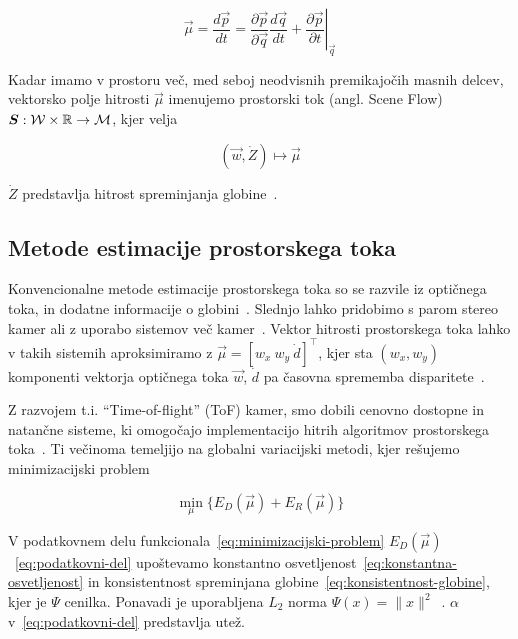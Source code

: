 \begin{equation}\label{eq:scene-flow}
	\vec{\mu} = \frac{d\vec{p}}{dt} = \frac{\partial \vec{p}}{\partial \vec{q}} \frac{d\vec{q}}{dt} + \left.\frac{\partial \vec{p}}{\partial t}\right|_{\vec{q}}
\end{equation}

Kadar imamo v prostoru več, med seboj neodvisnih premikajočih masnih delcev, vektorsko polje hitrosti $\vec{\mu}$ imenujemo prostorski tok (angl. Scene Flow) ${\boldsymbol{S}}: \mathcal{W} \times \mathbb{R} \to \mathcal{M}$, kjer velja

\begin{equation}
(\vec{w}, \dot{Z}) \mapsto \vec{\mu}
\label{eq:of-sf}
\end{equation}



$\dot{Z}$ predstavlja hitrost spreminjanja globine~\cite{yan2016scene}.

\subsection{Metode estimacije prostorskega toka}
Konvencionalne metode estimacije prostorskega toka so se razvile iz optičnega toka, in dodatne informacije o globini~\cite{yan2016scene}. Slednjo lahko pridobimo s parom stereo kamer ali z uporabo sistemov več kamer~\cite{jaimez2015primal}. Vektor hitrosti prostorskega toka lahko v takih sistemih aproksimiramo z $\vec{\mu} = \left[w_x~w_y~\dot{d}\right]^\top$, kjer sta $(w_x, w_y)$ komponenti vektorja optičnega toka $\vec{w}$, $\dot{d}$ pa časovna sprememba disparitete~\cite{yan2016scene}.

Z razvojem t.i. ``Time-of-flight'' (ToF) kamer, smo dobili cenovno dostopne in natančne sisteme, ki omogočajo implementacijo hitrih algoritmov prostorskega toka~\cite{yan2016scene,jaimez2015primal}. Ti večinoma temeljijo na globalni variacijski metodi, kjer rešujemo minimizacijski problem 

\begin{equation}\label{eq:minimizacijski-problem}
	\min_{\mu}\{E_D(\vec{\mu}) + E_R(\vec{\mu})\}
\end{equation}

V podatkovnem delu funkcionala~\eqref{eq:minimizacijski-problem} $E_D(\vec{\mu})$~\eqref{eq:podatkovni-del} upoštevamo konstantno osvetljenost~\eqref{eq:konstantna-osvetljenost} in konsistentnost spreminjana globine~\eqref{eq:konsistentnost-globine}, kjer je  $\Psi$ cenilka. Ponavadi je uporabljena $L_2$ norma $\Psi(x) = \| x \|^2$~\cite{yan2016scene}. $\alpha$ v~\eqref{eq:podatkovni-del} predstavlja utež.

